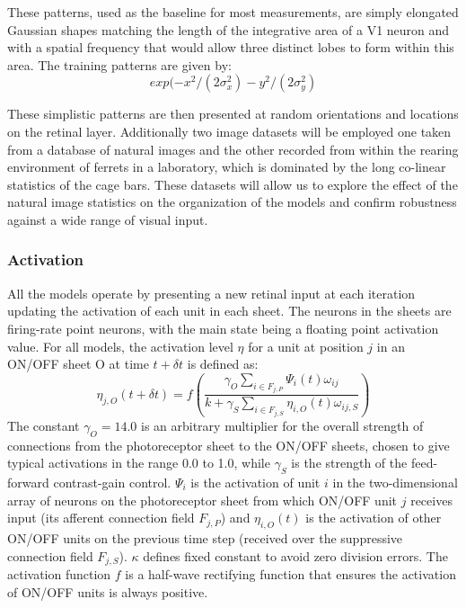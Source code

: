 These patterns, used as the baseline for most measurements, are simply
elongated Gaussian shapes matching the length of the integrative area
of a V1 neuron and with a spatial frequency that would allow three
distinct lobes to form within this area. The training patterns are
given by:
\begin{equation}
  exp(-x^2/(2\sigma_x^2) - y^2/(2\sigma_y^2)
\label{eqn:gausspattern}
\end{equation}

These simplistic patterns are then presented at random orientations
and locations on the retinal layer. Additionally two image datasets
will be employed one taken from a database of natural images and the
other recorded from within the rearing environment of ferrets in a
laboratory, which is dominated by the long co-linear statistics of the
cage bars. These datasets will allow us to explore the effect of the
natural image statistics on the organization of the models and confirm
robustness against a wide range of visual input.

\subsubsection*{Activation}

All the models operate by presenting a new retinal input at each
iteration updating the activation of each unit in each sheet. The
neurons in the sheets are firing-rate point neurons, with the main
state being a floating point activation value.  For all models, the
activation level $\eta$ for a unit at position $j$ in an ON/OFF sheet
O at time $t+\delta t$ is defined as:
\begin{equation}
\eta_{j, O}(t+\delta t)=f\left(\frac{\gamma_{O}\sum_{i\in
    F_{j,P}}\Psi_{i}(t)\omega_{ij}}{k+\gamma_{S}\sum_{i\in
    F_{j,S}}\eta_{i, O}(t)\omega_{ij, S}}\right)
\label{eqn:lgnactivation}
\end{equation}
The constant $\gamma_{O}=14.0$ is an arbitrary multiplier for the
overall strength of connections from the photoreceptor sheet to the
ON/OFF sheets, chosen to give typical activations in the range 0.0 to
1.0, while $\gamma_{S}$ is the strength of the feed-forward
contrast-gain control. $\Psi_{i}$ is the activation of unit $i$ in the
two-dimensional array of neurons on the photoreceptor sheet from which
ON/OFF unit $j$ receives input (its afferent connection field
$F_{j,P}$) and $\eta_{i, O}(t)$ is the activation of other ON/OFF
units on the previous time step (received over the suppressive
connection field $F_{j,S}$). $\kappa$ defines fixed constant to avoid
zero division errors. The activation function $f$ is a half-wave
rectifying function that ensures the activation of ON/OFF units is
always positive.

